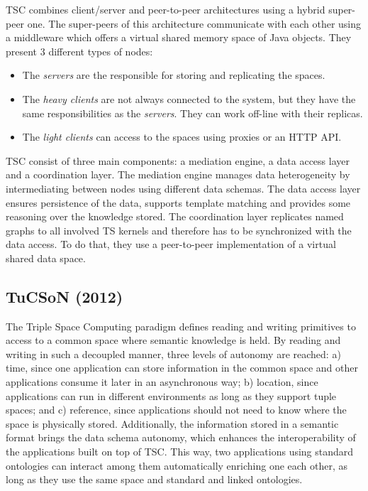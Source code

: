 TSC combines client/server and peer-to-peer architectures using a hybrid super-peer one.
The super-peers of this architecture communicate with each other using a middleware which offers a virtual shared memory space of Java objects.
They present 3 different types of nodes:
\begin{itemize}
  \item The \emph{servers} are the responsible for storing and replicating the spaces.
  \item The \emph{heavy clients} are not always connected to the system, but they have the same responsibilities as the \emph{servers}.
	They can work off-line with their replicas.
  \item The \emph{light clients} can access to the spaces using proxies or an HTTP API.
\end{itemize}


TSC consist of three main components: a mediation engine, a data access layer and a coordination layer.
The mediation engine manages data heterogeneity by intermediating between nodes using different data schemas.
The data access layer ensures persistence of the data, supports template matching and provides some reasoning over the knowledge stored.
The coordination layer replicates named graphs to all involved TS kernels and therefore has to be synchronized with the data access.
To do that, they use a peer-to-peer implementation of a virtual shared data space. %



\subsection{TuCSoN (2012)}


The Triple Space Computing paradigm defines reading and writing primitives to access to a common space where semantic
knowledge is held. By reading and writing in such a decoupled manner, three levels of autonomy are reached: a) time,
since one application can store information in the common space and other applications consume it later in an
asynchronous way; b) location, since applications can run in different environments as long as they support tuple
spaces; and c) reference, since applications should not need to know where the space is physically stored. Additionally,
the information stored in a semantic format brings the data schema autonomy, which enhances the interoperability of the
applications built on top of TSC. This way, two applications using standard ontologies can interact among them
automatically enriching one each other, as long as they use the same space and standard and linked ontologies.


